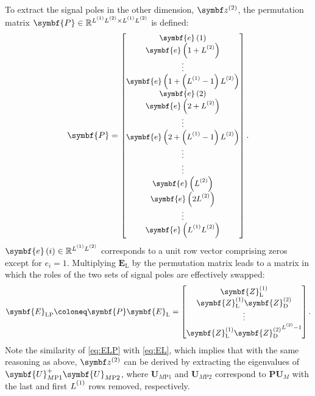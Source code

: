 To extract the signal poles in the other dimension, $\bdztwo$, the permutation
matrix $\symbf{P} \in \mathbb{R}^{\Lone \Ltwo \times \Lone \Ltwo}$ is defined:
\begin{equation}
    \symbf{P} =
    {\small
    \begin{bmatrix}
        \symbf{e}\left(1\right) \\
        \symbf{e}\left(1 + \Ltwo\right) \\
        \vdots \\
        \symbf{e}\left(1 + \left(\Lone - 1\right)\Ltwo\right) \\
        \symbf{e}\left(2\right) \\
        \symbf{e}\left(2 + \Ltwo\right) \\
        \vdots \\
        \symbf{e}\left(2 + \left(\Lone - 1\right)\Ltwo\right) \\
        \vdots \\
        \vdots \\
        \symbf{e}\left(\Ltwo\right) \\
        \symbf{e}\left(2\Ltwo\right) \\
        \vdots \\
        \symbf{e}\left(\Lone \Ltwo\right) \\
    \end{bmatrix}.
    }
\end{equation}
$\symbf{e}\left(i\right) \in \mathbb{R}^{\Lone \Ltwo}$ corresponds to a unit row
vector comprising zeros except for $e_i = 1$.
Multiplying $\symbf{E}_{\text{L}}$ by the permutation matrix leads to a matrix
in which the roles of the two sets of signal poles are effectively swapped:
\begin{equation}
    \symbf{E}_{\text{LP}} \coloneq \symbf{P} \symbf{E}_{\text{L}} =
    \begin{bmatrix}
        \symbf{Z}^{(1)}_{\text{L}} \\
        \symbf{Z}^{(1)}_{\text{L}} \symbf{Z}^{(2)}_{\text{D}} \\
        \vdots \\
        \symbf{Z}^{(1)}_{\text{L}} {\symbf{Z}^{(2)}_{\text{D}}}^{\Ltwo - 1} \\
    \end{bmatrix}.\label{eq:ELP}
\end{equation}
Note the similarity of \cref{eq:ELP} with \cref{eq:EL}, which
implies that with the same reasoning as above, $\bdztwo$ can be derived
by extracting the eigenvalues of $\symbf{U}_{M\text{P}1}^+
\symbf{U}_{M\text{P}2}^{\vphantom{+}}$, where $\symbf{U}_{M\text{P}1}$ and
$\symbf{U}_{M\text{P}2}$ correspond to $\symbf{P} \symbf{U}_M$
with the last and first $\Lone$ rows removed, respectively.

